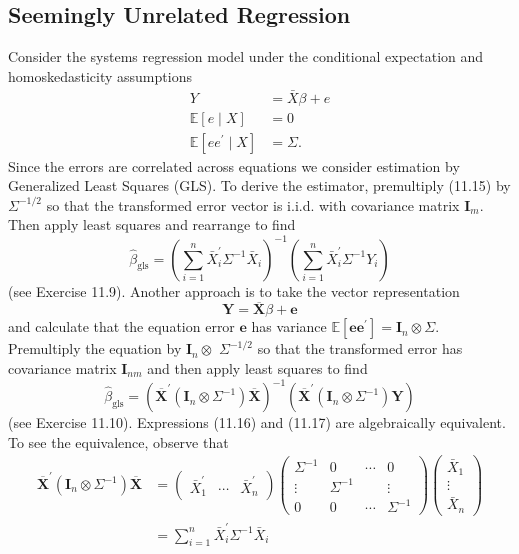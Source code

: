 \documentclass[10pt]{article}
\begin{document}
\subsection{Seemingly Unrelated Regression}
Consider the systems regression model under the conditional expectation and homoskedasticity assumptions
$$
\begin{aligned}
Y &=\bar{X} \beta+e \\
\mathbb{E}[e \mid X] &=0 \\
\mathbb{E}\left[e e^{\prime} \mid X\right] &=\Sigma .
\end{aligned}
$$
Since the errors are correlated across equations we consider estimation by Generalized Least Squares (GLS). To derive the estimator, premultiply (11.15) by $\Sigma^{-1 / 2}$ so that the transformed error vector is i.i.d. with covariance matrix $\boldsymbol{I}_{m}$. Then apply least squares and rearrange to find
$$
\widehat{\beta}_{\mathrm{gls}}=\left(\sum_{i=1}^{n} \bar{X}_{i}^{\prime} \Sigma^{-1} \bar{X}_{i}\right)^{-1}\left(\sum_{i=1}^{n} \bar{X}_{i}^{\prime} \Sigma^{-1} Y_{i}\right)
$$
(see Exercise 11.9). Another approach is to take the vector representation
$$
\boldsymbol{Y}=\overline{\boldsymbol{X}} \beta+\boldsymbol{e}
$$
and calculate that the equation error $\boldsymbol{e}$ has variance $\mathbb{E}\left[\boldsymbol{e} \boldsymbol{e}^{\prime}\right]=\boldsymbol{I}_{n} \otimes \Sigma$. Premultiply the equation by $\boldsymbol{I}_{n} \otimes$ $\Sigma^{-1 / 2}$ so that the transformed error has covariance matrix $\boldsymbol{I}_{n m}$ and then apply least squares to find
$$
\widehat{\beta}_{\mathrm{gls}}=\left(\overline{\boldsymbol{X}}^{\prime}\left(\boldsymbol{I}_{n} \otimes \Sigma^{-1}\right) \overline{\boldsymbol{X}}\right)^{-1}\left(\overline{\boldsymbol{X}}^{\prime}\left(\boldsymbol{I}_{n} \otimes \Sigma^{-1}\right) \boldsymbol{Y}\right)
$$
(see Exercise 11.10). Expressions (11.16) and (11.17) are algebraically equivalent. To see the equivalence, observe that
$$
\begin{aligned}
\overline{\boldsymbol{X}}^{\prime}\left(\boldsymbol{I}_{n} \otimes \Sigma^{-1}\right) \overline{\boldsymbol{X}} &=\left(\begin{array}{lll}
\bar{X}_{1}^{\prime} & \cdots & \bar{X}_{n}^{\prime}
\end{array}\right)\left(\begin{array}{cccc}
\Sigma^{-1} & 0 & \cdots & 0 \\
\vdots & \Sigma^{-1} & & \vdots \\
0 & 0 & \cdots & \Sigma^{-1}
\end{array}\right)\left(\begin{array}{c}
\bar{X}_{1} \\
\vdots \\
\bar{X}_{n}
\end{array}\right) \\
&=\sum_{i=1}^{n} \bar{X}_{i}^{\prime} \Sigma^{-1} \bar{X}_{i}
\end{aligned}
$$
\end{document}
